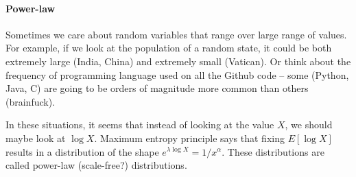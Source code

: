 \documentclass{article}
\begin{document}
\paragraph{Power-law}

Sometimes we care about random variables that range over large range of values. For example, if we look at the population of a random state, it could be both extremely large (India, China) and extremely small (Vatican). Or think about the frequency of programming language used on all the Github code -- some (Python, Java, C) are going to be orders of magnitude more common than others (brainfuck). 

In these situations, it seems that instead of looking at the value $X$, we should maybe look at $\log X$. Maximum entropy principle says that fixing $E[\log X]$ results in a distribution of the shape $e^{\lambda \log X} = 1 / x^{\alpha}$. These distributions are called power-law (scale-free?) distributions. 



\end{document}
